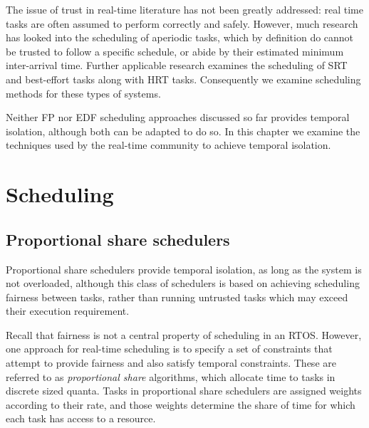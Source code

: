 The issue of trust in real-time literature has not been greatly addressed: real time tasks are often
assumed to perform correctly and safely.  However, much research has looked into the scheduling of
aperiodic tasks, which by definition do cannot be trusted to follow a specific schedule, or abide by
their estimated minimum inter-arrival time. Further applicable research examines the scheduling of
\gls{SRT} and best-effort tasks along with \gls{HRT} tasks. Consequently we examine scheduling methods for
these types of systems. 

Neither \gls{FP} nor \gls{EDF} scheduling
approaches discussed so far provides temporal isolation, although both can be adapted to do so.  In
this chapter we examine the techniques used by the real-time community to achieve temporal
isolation.


\section{Scheduling}


\subsection{Proportional share schedulers}
\label{s:pfair}

Proportional share schedulers provide temporal isolation, as long as the system is not overloaded,
although this class of schedulers is based on achieving scheduling fairness between tasks, rather
than running untrusted tasks which may exceed their execution requirement. 

Recall that fairness is not a central property of scheduling in an \gls{RTOS}. However, one approach
for real-time scheduling is to specify a set of constraints that attempt to provide fairness and
also satisfy temporal constraints.  These are referred to as \emph{proportional share} algorithms,
which allocate time to tasks in discrete sized quanta. Tasks in proportional share schedulers are assigned 
weights according to their rate, and those weights determine the share of time for which each task 
has access to a resource.

